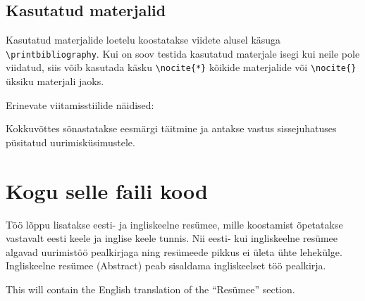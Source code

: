 \documentclass{trkut}%
\begin{document}
\section{Kasutatud materjalid}
Kasutatud materjalide loetelu koostatakse viidete alusel käsuga \verb!\printbibliography!. Kui on soov testida kasutatud materjale isegi kui neile pole viidatud, siis võib kasutada käsku \verb!\nocite{*}! kõikide materjalide või \verb!\nocite{}! üksiku materjali jaoks. \parencite[1--5]{palma15}

Erinevate viitamisstiilide näidised: \parencite[333]{test0}

\parencite{test12a} \parencite{test12b}

\parencite{test9}

\parencite[27]{test3}

\parencite{test11}


Kokkuvõttes sõnastatakse eesmärgi täitmine ja antakse vastus sissejuhatuses püsitatud uurimisküsimustele.

\nocite{*}
\printbibliography

\appendix

\chapter{Kogu selle faili kood}\label{lisa1}
\tiny

\normalsize

\appendixend

Töö lõppu lisatakse eesti- ja ingliskeelne resümee, mille koostamist õpetatakse vastavalt eesti keele ja inglise keele tunnis. Nii eesti- kui ingliskeelne resümee algavad uurimistöö pealkirjaga ning resümeede pikkus ei ületa ühte lehekülge. Ingliskeelne resümee (Abstract) peab sisaldama ingliskeelset töö pealkirja.

This will contain the English translation of the \enquote{Resümee} section.

\kinnitusleht
\end{document}
